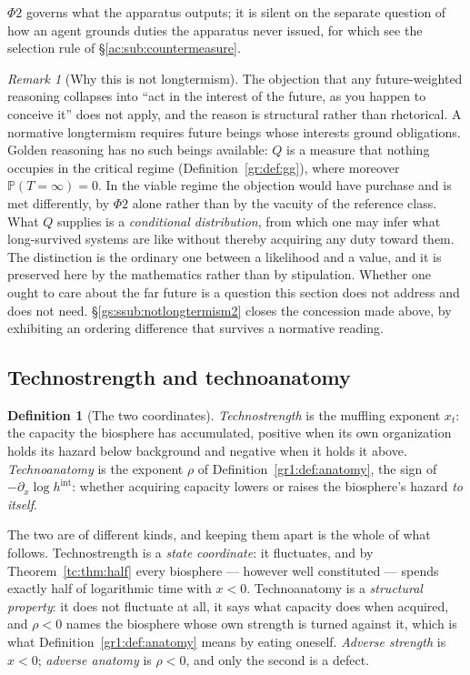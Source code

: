 \documentclass[11pt]{article}
\numberwithin{equation}{section}
\theoremstyle{plain}
\theoremstyle{definition}
\newtheorem{definition}[theorem]{Definition}
\theoremstyle{remark}
\newtheorem{remark}[theorem]{Remark}
\newcommand{\PP}{\mathbb{P}}
\begin{document}
\noindent $\Phi2$ governs what the apparatus outputs; it is silent on the
separate question of how an agent grounds duties the apparatus never
issued, for which see the selection rule of
\S\ref{ac:sub:countermeasure}.

\begin{remark}[Why this is not longtermism]\label{gr:rem:notlongtermism}
The objection that any future-weighted reasoning collapses into ``act in
the interest of the future, as you happen to conceive it'' does not
apply, and the reason is structural rather than rhetorical. A normative
longtermism requires future beings whose interests ground obligations.
Golden reasoning has no such beings available: $Q$ is a measure that
nothing occupies in the critical regime
(Definition~\ref{gr:def:gg}), where moreover $\PP(T=\infty)=0$. In the
viable regime the objection would have purchase and is met differently,
by $\Phi2$ alone rather than by the vacuity of the reference class. What $Q$ supplies is a
\emph{conditional distribution}, from which one may infer what
long-survived systems are like without thereby acquiring any duty toward
them. The distinction is the ordinary one between a likelihood and a
value, and it is preserved here by the mathematics rather than by
stipulation. Whether one ought to care about the far future is a
question this section does not address and does not need.
\S\ref{gs:ssub:notlongtermism2} closes the concession made above, by
exhibiting an ordering difference that survives a normative reading.
\end{remark}

\subsection{Technostrength and technoanatomy}\label{gr:sub:coords}

\begin{definition}[The two coordinates]\label{gr:def:coords}
\emph{Technostrength} is the muffling exponent $x_t$: the capacity the
biosphere has accumulated, positive when its own organization holds its
hazard below background and negative when it holds it above.
\emph{Technoanatomy} is the exponent $\rho$ of
Definition~\ref{gr1:def:anatomy}, the sign of
$-\partial_x\log h^{\mathrm{int}}$: whether acquiring capacity lowers or
raises the biosphere's hazard \emph{to itself}.

The two are of different kinds, and keeping them apart is the whole of
what follows. Technostrength is a \emph{state coordinate}: it
fluctuates, and by Theorem~\ref{tc:thm:half} every biosphere ---
however well constituted --- spends exactly half of logarithmic time
with $x<0$. Technoanatomy is a \emph{structural property}: it does not
fluctuate at all, it says what capacity does when acquired, and
$\rho<0$ names the biosphere whose own strength is turned against it,
which is what Definition~\ref{gr1:def:anatomy} means by eating oneself.
\emph{Adverse strength} is $x<0$; \emph{adverse anatomy} is $\rho<0$,
and only the second is a defect.
\end{definition}
\end{document}
